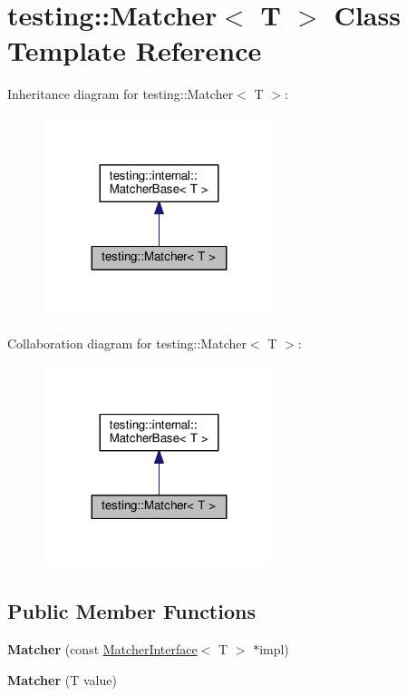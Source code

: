 \hypertarget{classtesting_1_1Matcher}{}\section{testing\+:\+:Matcher$<$ T $>$ Class Template Reference}
\label{classtesting_1_1Matcher}


Inheritance diagram for testing\+:\+:Matcher$<$ T $>$\+:\nopagebreak
\begin{figure}[H]
\begin{center}
\leavevmode
\includegraphics[width=191pt]{classtesting_1_1Matcher__inherit__graph}
\end{center}
\end{figure}


Collaboration diagram for testing\+:\+:Matcher$<$ T $>$\+:\nopagebreak
\begin{figure}[H]
\begin{center}
\leavevmode
\includegraphics[width=191pt]{classtesting_1_1Matcher__coll__graph}
\end{center}
\end{figure}
\subsection*{Public Member Functions}
\begin{DoxyCompactItemize}
\item 
{\bfseries Matcher} (const \hyperlink{classtesting_1_1MatcherInterface}{Matcher\+Interface}$<$ T $>$ $\ast$impl)\hypertarget{classtesting_1_1Matcher_aea32eb3f86233853de91929fb2691bf3}{}\label{classtesting_1_1Matcher_aea32eb3f86233853de91929fb2691bf3}

\item 
{\bfseries Matcher} (T value)\hypertarget{classtesting_1_1Matcher_adc75e0bd47ffc75ba8a5f760372d0493}{}\label{classtesting_1_1Matcher_adc75e0bd47ffc75ba8a5f760372d0493}

\end{DoxyCompactItemize}
